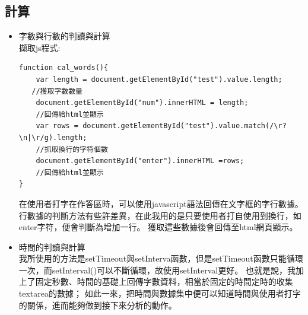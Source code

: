 \subsection{計算}
\begin{itemize}
	\item 字數與行數的判讀與計算\\
	擷取js程式:

\begin{lstlisting}[caption=js字數與行數的判讀與計算]
function cal_words(){
	var length = document.getElementById("test").value.length;
   //獲取字數數量
	document.getElementById("num").innerHTML = length;
	//回傳給html並顯示
	var rows = document.getElementById("test").value.match(/\r?\n|\r/g).length;
	//抓取換行的字符個數
	document.getElementById("enter").innerHTML =rows;
	//回傳給html並顯示
}
\end{lstlisting}

在使用者打字在作答區時，可以使用javascript語法回傳在文字框的字行數據。
行數據的判斷方法有些許差異，在此我用的是只要使用者打自使用到換行，如enter字符，便會判斷為增加一行。
獲取這些數據後會回傳至html網頁顯示。
\item 時間的判讀與計算\\
我所使用的方法是setTimeout與setInterva函數，但是setTimeout函數只能循環一次，而setInterval()可以不斷循環，故使用setInterval更好。\cite{name20}
也就是說，我加上了固定秒數、時間的基礎上回傳字數資料，相當於固定的時間定時的收集textarea的數據；
如此一來，把時間與數據集中便可以知道時間與使用者打字的關係，進而能夠做到接下來分析的動作。

\end{itemize}
